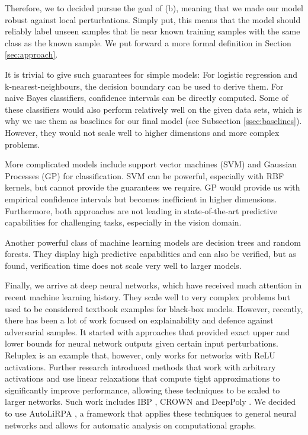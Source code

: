 \documentclass[acmsmall,nonacm]{acmart}
\begin{document}
Therefore, we to decided pursue the goal of (b), meaning that we made our model robust against local perturbations. Simply put, this means that the model should reliably label unseen samples that lie near known training samples with the same class as the known sample. We put forward a more formal definition in Section \ref{sec:approach}. 

It is trivial to give such guarantees for simple models: For logistic regression and k-nearest-neighbours, the decision boundary can be used to derive them. For naive Bayes classifiers, confidence intervals can be directly computed. Some of these classifiers would also perform relatively well on the given data sets, which is why we use them as baselines for our final model (see Subsection \ref{ssec:baselines}). However, they would not scale well to higher dimensions and more complex problems. 

More complicated models include support vector machines (SVM) and Gaussian Processes (GP) for classification. SVM can be powerful, especially with RBF kernels, but cannot provide the guarantees we require. GP would provide us with empirical confidence intervals but becomes inefficient in higher dimensions. Furthermore, both approaches are not leading in state-of-the-art predictive capabilities for challenging tasks, especially in the vision domain.

Another powerful class of machine learning models are decision trees and random forests. They display high predictive capabilities and can also be verified, but as \cite{tornblom2018formal} found, verification time does not scale very well to larger models.

Finally, we arrive at deep neural networks, which have received much attention in recent machine learning history. They scale well to very complex problems but used to be considered textbook examples for black-box models. However, recently, there has been a lot of work focused on explainability and defence against adversarial samples. It started with approaches that provided exact upper and lower bounds for neural network outputs given certain input perturbations. Reluplex \cite{katz2017reluplex} is an example that, however, only works for networks with ReLU activations. Further research introduced methods that work with arbitrary activations and use linear relaxations that compute tight approximations to significantly improve performance, allowing these techniques to be scaled to larger networks. Such work includes IBP \cite{gowal2019effectivenessIBP}, CROWN \cite{zhang2018efficient} and DeepPoly \cite{singh2019abstractDeepPoly}. We decided to use AutoLiRPA \cite{xu2020autoLiRPA}, a framework that applies these techniques to general neural networks and allows for automatic analysis on computational graphs.
\end{document}
